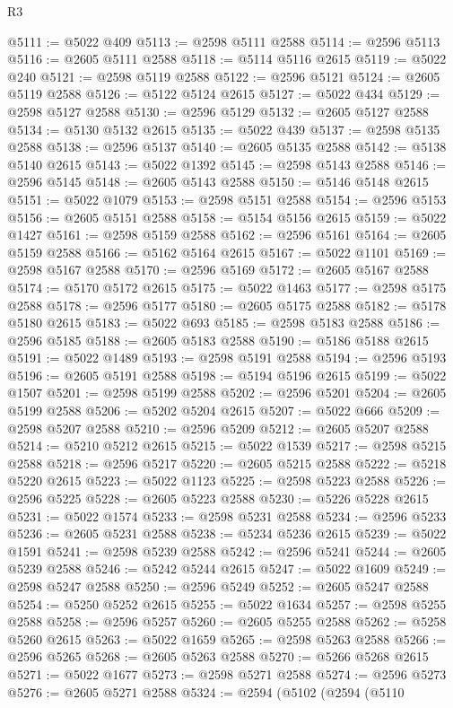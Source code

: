 \begin{lexlean}{R3}
\begin{coremodule}
@5111 := @5022 @409
@5113 := @2598 @5111 @2588
@5114 := @2596 @5113
@5116 := @2605 @5111 @2588
@5118 := @5114 @5116 @2615
@5119 := @5022 @240
@5121 := @2598 @5119 @2588
@5122 := @2596 @5121
@5124 := @2605 @5119 @2588
@5126 := @5122 @5124 @2615
@5127 := @5022 @434
@5129 := @2598 @5127 @2588
@5130 := @2596 @5129
@5132 := @2605 @5127 @2588
@5134 := @5130 @5132 @2615
@5135 := @5022 @439
@5137 := @2598 @5135 @2588
@5138 := @2596 @5137
@5140 := @2605 @5135 @2588
@5142 := @5138 @5140 @2615
@5143 := @5022 @1392
@5145 := @2598 @5143 @2588
@5146 := @2596 @5145
@5148 := @2605 @5143 @2588
@5150 := @5146 @5148 @2615
@5151 := @5022 @1079
@5153 := @2598 @5151 @2588
@5154 := @2596 @5153
@5156 := @2605 @5151 @2588
@5158 := @5154 @5156 @2615
@5159 := @5022 @1427
@5161 := @2598 @5159 @2588
@5162 := @2596 @5161
@5164 := @2605 @5159 @2588
@5166 := @5162 @5164 @2615
@5167 := @5022 @1101
@5169 := @2598 @5167 @2588
@5170 := @2596 @5169
@5172 := @2605 @5167 @2588
@5174 := @5170 @5172 @2615
@5175 := @5022 @1463
@5177 := @2598 @5175 @2588
@5178 := @2596 @5177
@5180 := @2605 @5175 @2588
@5182 := @5178 @5180 @2615
@5183 := @5022 @693
@5185 := @2598 @5183 @2588
@5186 := @2596 @5185
@5188 := @2605 @5183 @2588
@5190 := @5186 @5188 @2615
@5191 := @5022 @1489
@5193 := @2598 @5191 @2588
@5194 := @2596 @5193
@5196 := @2605 @5191 @2588
@5198 := @5194 @5196 @2615
@5199 := @5022 @1507
@5201 := @2598 @5199 @2588
@5202 := @2596 @5201
@5204 := @2605 @5199 @2588
@5206 := @5202 @5204 @2615
@5207 := @5022 @666
@5209 := @2598 @5207 @2588
@5210 := @2596 @5209
@5212 := @2605 @5207 @2588
@5214 := @5210 @5212 @2615
@5215 := @5022 @1539
@5217 := @2598 @5215 @2588
@5218 := @2596 @5217
@5220 := @2605 @5215 @2588
@5222 := @5218 @5220 @2615
@5223 := @5022 @1123
@5225 := @2598 @5223 @2588
@5226 := @2596 @5225
@5228 := @2605 @5223 @2588
@5230 := @5226 @5228 @2615
@5231 := @5022 @1574
@5233 := @2598 @5231 @2588
@5234 := @2596 @5233
@5236 := @2605 @5231 @2588
@5238 := @5234 @5236 @2615
@5239 := @5022 @1591
@5241 := @2598 @5239 @2588
@5242 := @2596 @5241
@5244 := @2605 @5239 @2588
@5246 := @5242 @5244 @2615
@5247 := @5022 @1609
@5249 := @2598 @5247 @2588
@5250 := @2596 @5249
@5252 := @2605 @5247 @2588
@5254 := @5250 @5252 @2615
@5255 := @5022 @1634
@5257 := @2598 @5255 @2588
@5258 := @2596 @5257
@5260 := @2605 @5255 @2588
@5262 := @5258 @5260 @2615
@5263 := @5022 @1659
@5265 := @2598 @5263 @2588
@5266 := @2596 @5265
@5268 := @2605 @5263 @2588
@5270 := @5266 @5268 @2615
@5271 := @5022 @1677
@5273 := @2598 @5271 @2588
@5274 := @2596 @5273
@5276 := @2605 @5271 @2588
@5324 := @2594
    (@5102
      (@2594
        (@5110

\end{coremodule}
\end{lexlean}
